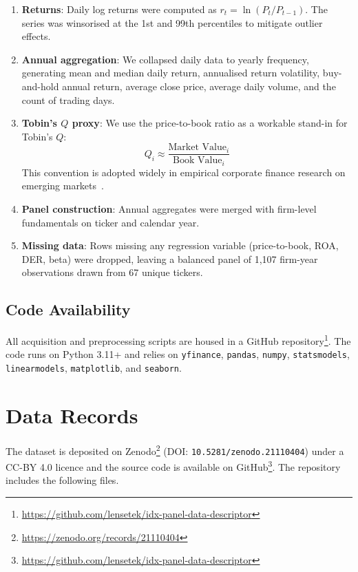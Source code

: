 \documentclass[11pt,a4paper]{article}
\begin{document}
\begin{enumerate}[leftmargin=*,nosep]
\item \textbf{Returns}: Daily log returns were computed as $r_t = \ln(P_t / P_{t-1})$. The series was winsorised at the 1st and 99th percentiles to mitigate outlier effects.
\item \textbf{Annual aggregation}: We collapsed daily data to yearly frequency, generating mean and median daily return, annualised return volatility, buy-and-hold annual return, average close price, average daily volume, and the count of trading days.
\item \textbf{Tobin's $Q$ proxy}: We use the price-to-book ratio as a workable stand-in for Tobin's $Q$:
  \begin{equation}
  Q_i \approx \frac{\text{Market Value}_i}{\text{Book Value}_i}
  \end{equation}
  \label{eq:tobinq}
  This convention is adopted widely in empirical corporate finance research on emerging markets~\cite{dang2018}.
\item \textbf{Panel construction}: Annual aggregates were merged with firm-level fundamentals on ticker and calendar year.
\item \textbf{Missing data}: Rows missing any regression variable (price-to-book, ROA, DER, beta) were dropped, leaving a balanced panel of 1{,}107 firm-year observations drawn from 67 unique tickers.
\end{enumerate}

\subsection{Code Availability}

All acquisition and preprocessing scripts are housed in a GitHub repository\footnote{\url{https://github.com/lensetek/idx-panel-data-descriptor}}. The code runs on Python 3.11+ and relies on \texttt{yfinance}, \texttt{pandas}, \texttt{numpy}, \texttt{statsmodels}, \texttt{linearmodels}, \texttt{matplotlib}, and \texttt{seaborn}.

\section{Data Records}

The dataset is deposited on Zenodo\footnote{\url{https://zenodo.org/records/21110404}} (DOI: \texttt{10.5281/zenodo.21110404}) under a CC-BY 4.0 licence and the source code is available on GitHub\footnote{\url{https://github.com/lensetek/idx-panel-data-descriptor}}. The repository includes the following files.
\end{document}
